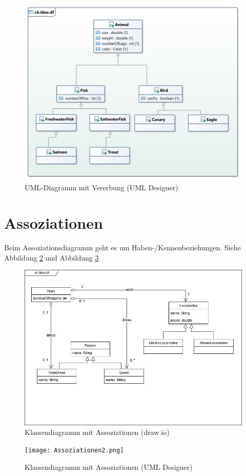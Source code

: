 \documentclass[a4paper, titlepage]{scrartcl}
\begin{document}
    \begin{figure}
        \includegraphics[width=\textwidth]{Klassendiagramm1b}
        \caption{UML-Diagramm mit Vererbung (UML Designer)}
        \label{VererbungUmlDesigner}
    \end{figure}
    
    \section{Assoziationen}
    Beim Assoziationsdiagramm geht es um Haben-/Kennenbeziehungen. 
    Siehe Abbildung \ref{AssoziationenDrawIO} und 
    Abbildung \ref{AssoziationenUmlDesigner}
    \begin{figure}
        \includegraphics[width=\textwidth]{Assoziationen.png}
        \caption{Klassendiagramm mit Assoziationen (draw.io)}
        \label{AssoziationenDrawIO}
    \end{figure}
    \begin{figure}
        \texttt{[image: Assoziationen2.png]}
        \caption{Klassendiagramm mit Assoziationen (UML Designer)}
        \label{AssoziationenUmlDesigner}
    \end{figure}
\end{document}

